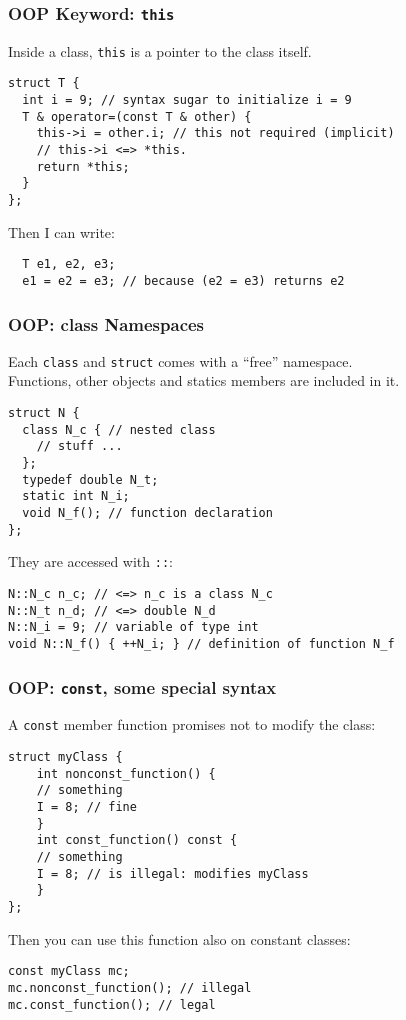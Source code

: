 \documentclass{beamer}
\newcommand{\code}[1]{{\color{cgreen}\texttt{#1}}}
\begin{document}
\begin{frame}[fragile]
 \frametitle{OOP Keyword: \code{this}}
 Inside a class, \code{this} is a pointer to the class itself.
 \begin{lstlisting}
struct T {
  int i = 9; // syntax sugar to initialize i = 9
  T & operator=(const T & other) {
    this->i = other.i; // this not required (implicit)
    // this->i <=> *this.
    return *this;
  }
};
 \end{lstlisting}
 Then I can write:
 \begin{lstlisting}
  T e1, e2, e3;
  e1 = e2 = e3; // because (e2 = e3) returns e2
 \end{lstlisting}

\end{frame}

\begin{frame}[fragile]
 \frametitle{OOP: class Namespaces}
 Each \code{class} and \code{struct} comes with a ``free'' namespace. \\
 Functions, other objects and statics members are included in it.
 \begin{lstlisting}
struct N {
  class N_c { // nested class
    // stuff ...
  };
  typedef double N_t;
  static int N_i;
  void N_f(); // function declaration
};
 \end{lstlisting}
 They are accessed with \code{::}:
 \begin{lstlisting}
N::N_c n_c; // <=> n_c is a class N_c
N::N_t n_d; // <=> double N_d
N::N_i = 9; // variable of type int
void N::N_f() { ++N_i; } // definition of function N_f
 \end{lstlisting}
\end{frame}

\begin{frame}[fragile]
 \frametitle{OOP: \code{const}, some special syntax}
 A \code{const} member function promises not to modify the class:
 \begin{lstlisting}
struct myClass {
    int nonconst_function() {
	// something
	I = 8; // fine
    }
    int const_function() const {
	// something
	I = 8; // is illegal: modifies myClass
    }
};
 \end{lstlisting}
 Then you can use this function also on constant classes:
 \begin{lstlisting}
const myClass mc;
mc.nonconst_function(); // illegal
mc.const_function(); // legal
 \end{lstlisting}
\end{frame}
 
\end{document}
